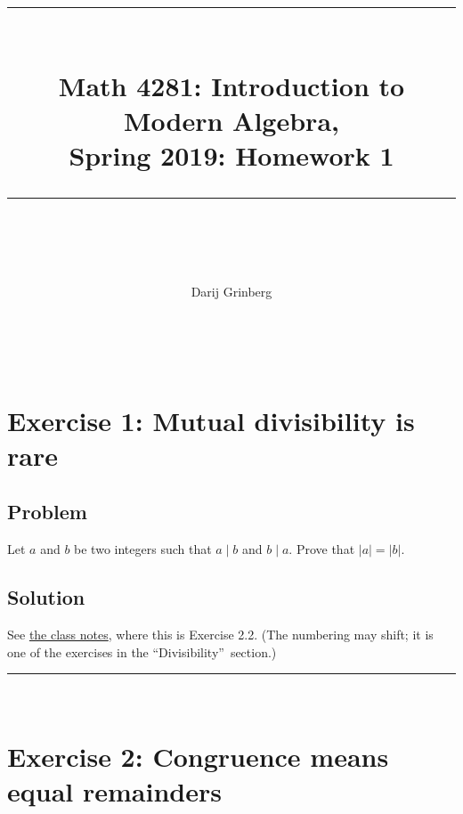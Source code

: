 \documentclass[paper=a4, fontsize=12pt]{scrartcl}%
\theoremstyle{plainsl}
\theoremstyle{definition}
\theoremstyle{remark}
\begin{document}
\title{ \\[25pt] \rule{\linewidth}{0.5pt} \\[0.4cm] {\huge Math 4281: Introduction to Modern Algebra, }\\Spring 2019: Homework 1\\\rule{\linewidth}{2pt} \\[0.5cm] }
\author{Darij Grinberg}
\maketitle

\rule{0pt}{0.3pt} \\[0.4cm]

\section{Exercise 1: Mutual divisibility is rare}

\subsection{Problem}

Let $a$ and $b$ be two integers such that $a \mid b$ and $b \mid a$. Prove
that $\left|  a \right|  = \left|  b \right|  $.

\subsection{Solution}

See \href{http://www-users.math.umn.edu/~dgrinber/19s/notes.pdf}{the class
notes}, where this is Exercise 2.2. (The numbering may shift; it is one of the
exercises in the \textquotedblleft Divisibility\textquotedblright\ section.)

\rule{\linewidth}{0.3pt} \\[0.4cm]

\section{Exercise 2: Congruence means equal remainders}
\end{document}
